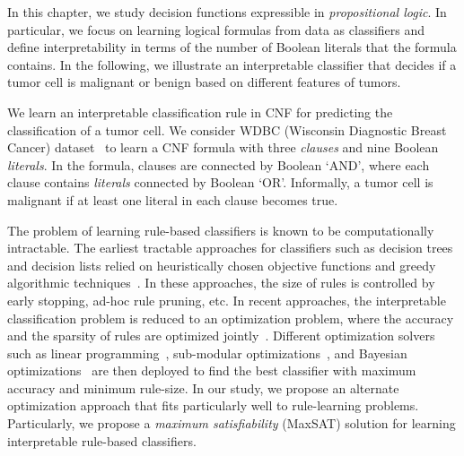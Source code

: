 In this chapter, we study decision functions expressible in \emph{propositional logic}. In particular, we focus on learning logical formulas from data as classifiers and define interpretability in terms of the number of Boolean literals that the formula contains. In the following, we illustrate an interpretable classifier that decides if a tumor cell is malignant or benign based on different features of tumors.

\vspace{1em}
\vspace{1em}


\begin{example}
	\normalfont
	We learn an interpretable classification rule in CNF for predicting the classification of a tumor cell. We consider WDBC (Wisconsin Diagnostic Breast Cancer) dataset~\cite{agarap2018breast} to learn a CNF formula with three \emph{clauses} and nine Boolean \emph{literals}. In the formula, clauses are connected by Boolean `AND', where each clause contains \emph{literals} connected by Boolean `OR'. Informally, a tumor cell is malignant if at least one literal in each clause becomes true.
\end{example}



The problem of learning rule-based classifiers is known to be computationally intractable. The earliest tractable approaches for classifiers such as decision trees and decision lists relied on heuristically chosen objective functions and greedy algorithmic techniques~\cite{ClarkN1989,CohenS1999,quinlan2014}. In these approaches, the size of rules is controlled by early stopping,  ad-hoc rule pruning, etc. In recent approaches, the interpretable classification problem is reduced to an optimization problem, where the accuracy and the sparsity of rules are optimized jointly~\cite{lakkaraju2016interpretable,narodytska2018learning}. Different optimization solvers such as linear programming~\cite{malioutov2013exact}, sub-modular optimizations~\cite{lakkaraju2016interpretable}, and Bayesian optimizations~\cite{letham2015interpretable} are then deployed to find the best classifier with maximum accuracy and minimum rule-size. In our study, we propose an alternate optimization approach that fits particularly well to rule-learning problems. Particularly,  we propose a \textit{maximum satisfiability} (MaxSAT)  solution for learning interpretable rule-based classifiers. 

